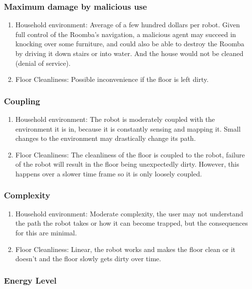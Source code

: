 \documentclass[11pt]{article}
\begin{document}
\subsubsection*{Maximum damage by malicious use}

\begin{enumerate}
\item Household environment: Average of a few hundred dollars per robot. Given full control of
the Roomba's navigation, a malicious agent may succeed in knocking over some furniture, and could
also be able to destroy the Roomba by driving it down stairs or into water. And the house would not
be cleaned (denial of service).
\item Floor Cleanliness: Possible inconvenience if the floor is left dirty.
\end{enumerate}

\subsubsection*{Coupling}

\begin{enumerate}
\item Household environment: The robot is moderately coupled with the environment it is in, because
it is constantly sensing and mapping it. Small changes to the environment may drastically change its
path. 
\item Floor Cleanliness: The cleanliness of the floor is coupled to the robot, failure of the robot
will result in the floor being unexpectedly dirty. However, this happens over a slower time frame so
it is only loosely coupled.
\end{enumerate}

\subsubsection*{Complexity}

\begin{enumerate}
\item Household environment: Moderate complexity, the user may not understand the path the robot
takes or how it can become trapped, but the consequences for this are minimal.
\item Floor Cleanliness: Linear, the robot works and makes the floor clean or it doesn't and the
floor slowly gets dirty over time.
\end{enumerate}

\subsubsection*{Energy Level}
\end{document}
